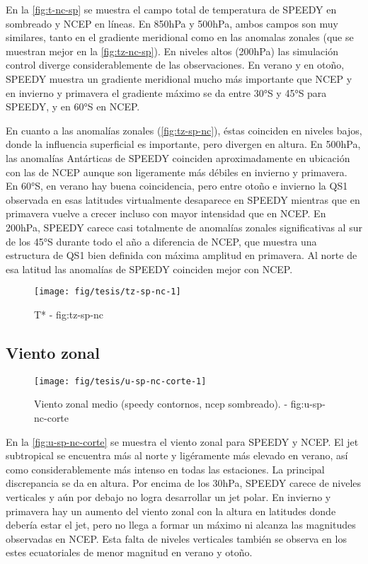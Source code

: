 \documentclass[spanish,a4paper,12p]{book}
\begin{document}
En la \autoref{fig:t-nc-sp} se muestra el campo total de temperatura de
SPEEDY en sombreado y NCEP en líneas. En 850hPa y 500hPa, ambos campos
son muy similares, tanto en el gradiente meridional como en las anomalas
zonales (que se muestran mejor en la \autoref{fig:tz-nc-sp}). En niveles
altos (200hPa) las simulación control diverge considerablemente de las
observaciones. En verano y en otoño, SPEEDY muestra un gradiente
meridional mucho más importante que NCEP y en invierno y primavera el
gradiente máximo se da entre 30°S y 45°S para SPEEDY, y en 60°S en NCEP.

En cuanto a las anomalías zonales (\autoref{fig:tz-sp-nc}), éstas
coinciden en niveles bajos, donde la influencia superficial es
importante, pero divergen en altura. En 500hPa, las anomalías Antárticas
de SPEEDY coinciden aproximadamente en ubicación con las de NCEP aunque
son ligeramente más débiles en invierno y primavera. En 60°S, en verano
hay buena coincidencia, pero entre otoño e invierno la QS1 observada en
esas latitudes virtualmente desaparece en SPEEDY mientras que en
primavera vuelve a crecer incluso con mayor intensidad que en NCEP. En
200hPa, SPEEDY carece casi totalmente de anomalías zonales
significativas al sur de los 45°S durante todo el año a diferencia de
NCEP, que muestra una estructura de QS1 bien definida con máxima
amplitud en primavera. Al norte de esa latitud las anomalías de SPEEDY
coinciden mejor con NCEP.

\begin{figure*}
\texttt{[image: fig/tesis/tz-sp-nc-1]} \caption{T* - fig:tz-sp-nc}\label{fig:tz-sp-nc}
\end{figure*}

\subsection{Viento zonal}\label{viento-zonal-1}

\begin{figure}

{\centering \texttt{[image: fig/tesis/u-sp-nc-corte-1]} 

}

\caption{Viento zonal medio (speedy contornos, ncep sombreado). - fig:u-sp-nc-corte}\label{fig:u-sp-nc-corte}
\end{figure}

En la \autoref{fig:u-sp-nc-corte} se muestra el viento zonal para SPEEDY
y NCEP. El jet subtropical se encuentra más al norte y ligéramente más
elevado en verano, así como considerablemente más intenso en todas las
estaciones. La principal discrepancia se da en altura. Por encima de los
30hPa, SPEEDY carece de niveles verticales y aún por debajo no logra
desarrollar un jet polar. En invierno y primavera hay un aumento del
viento zonal con la altura en latitudes donde debería estar el jet, pero
no llega a formar un máximo ni alcanza las magnitudes observadas en
NCEP. Esta falta de niveles verticales también se observa en los estes
ecuatoriales de menor magnitud en verano y otoño.
\end{document}
